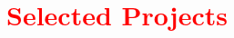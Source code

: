 \documentclass[a4paper,11pt]{article} %
\begin{document}
%
%
%
%




\section{ \texorpdfstring{\textcolor{red}{Selected Projects}}{Selected Projects} }
\end{document}
